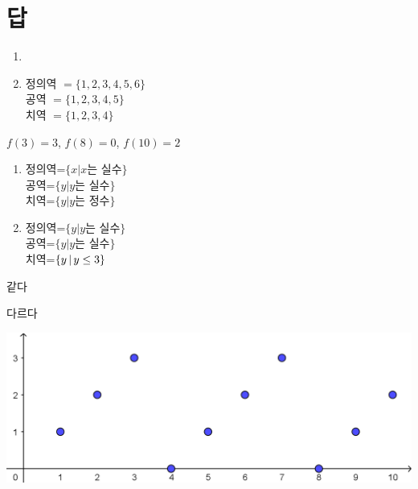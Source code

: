 \documentclass{oblivoir}
\begin{document}
\section*{답}
\begin{multicols*}{2}

%

%
\begin{enumerate}
\item
\mbox{}
\item
정의역	$=\{1,2,3,4,5,6\}$\\
공역		$=\{1,2,3,4,5\}$\\
치역		$=\{1,2,3,4\}$
\end{enumerate}

%
\(f(3)=3\), \(f(8)=0\), \(f(10)=2\)

%
\begin{enumerate}
\item
정의역=$\{x\vert x\text{는 실수}\}$\\
공역=$\{y\vert y\text{는 실수}\}$\\
치역=$\{y\vert y\text{는 정수}\}$
\item
정의역=$\{y\vert y\text{는 실수}\}$\\
공역=$\{y\vert y\text{는 실수}\}$\\
치역=\(\{y\,|\, y\le3\}\)
\end{enumerate}

%
\begin{enumerate*}[itemjoin=\qquad]
\item
같다
\item
다르다
\end{enumerate*}

%
\begin{center}
\includegraphics[width=\columnwidth]{graph_3a}
\end{center}


\end{multicols*}
\end{document}
